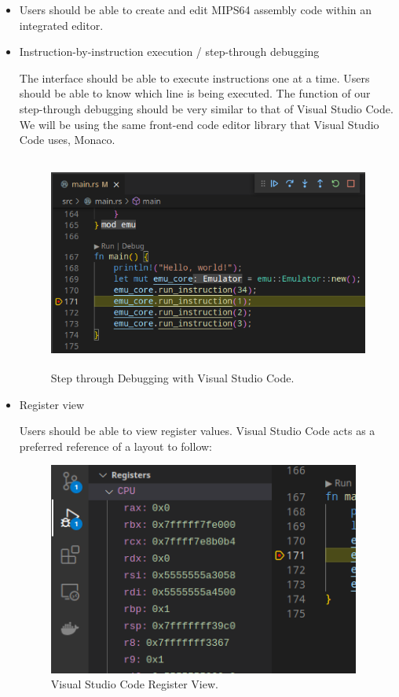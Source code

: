 \documentclass[
    paper=letter,
    parskip=half,
    fontsize=12pt,
    titlepage=firstiscover,
    toc=bibliography,
    numbers=endperiod
]{scrartcl}
\begin{document}
\begin{itemize}
    \item Users should be able to create and edit MIPS64 assembly code within an
          integrated editor.
    \item Instruction-by-instruction execution / step-through debugging

          The interface should be able to execute instructions one at a time.
          Users should be able to know which line is being executed. The function
          of our step-through debugging should be very similar to that of Visual
          Studio Code. We will be using the same front-end code editor library
          that Visual Studio Code uses, Monaco.

          \begin{figure}[H]
              \includegraphics[height=7cm]{step-through-debugging}
              \caption{Step through Debugging with Visual Studio Code.}
          \end{figure}

    \item Register view

          Users should be able to view register values. Visual Studio Code acts as
          a preferred reference of a layout to follow:

          \begin{figure}[H]
              \includegraphics[height=7cm]{vs-code-registers}
              \caption{Visual Studio Code Register View.}
          \end{figure}


\end{itemize}
\end{document}
